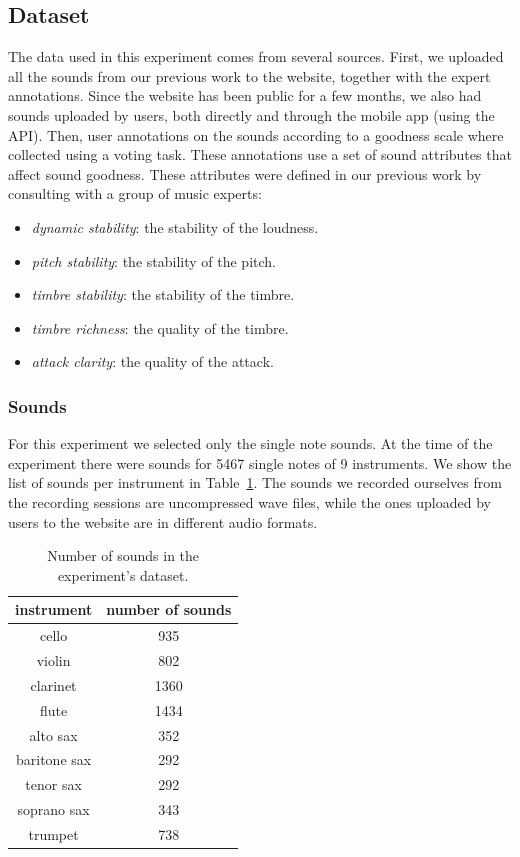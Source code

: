 \documentclass{article}
\begin{document}
\subsection{Dataset}
The data used in this experiment comes from several sources. First, we uploaded all the sounds from our previous work to the website, together with the expert annotations. Since the website has been public for a few months, we also had  sounds uploaded by users, both directly and through the mobile app (using the API). Then, user annotations on the sounds according to a goodness scale where collected using a voting task. These annotations use a set of sound attributes that affect sound goodness. These attributes were defined in our previous work \cite{01} by consulting with a group of music experts:   
\begin{itemize}
	\item{\textit{dynamic stability}: the stability of the loudness.}
	\item{\textit{pitch stability}: the stability of the pitch.}
	\item{\textit{timbre stability}: the stability of the timbre.}
	\item{\textit{timbre richness}: the quality of the timbre.}
	\item{\textit{attack clarity}: the quality of the attack.}
\end{itemize}

\subsubsection{Sounds}
For this experiment we selected only the single note sounds. At the time of the experiment there were sounds for 5467 single notes of 9 instruments. We show the list of sounds per instrument in Table~\ref{sounds}. The sounds we recorded ourselves from the recording sessions are uncompressed wave files, while the ones uploaded by users to the website are in different audio formats.  

\begin{table}[ht]
\centering
\begin{tabular}{cc}
\hline
instrument   & number of sounds \\ \hline
cello        & 935              \\
violin       & 802              \\
clarinet     & 1360             \\
flute        & 1434             \\
alto sax     & 352              \\
baritone sax & 292              \\
tenor sax    & 292              \\
soprano sax  & 343              \\
trumpet      & 738              \\ \hline
\end{tabular}
\caption{Number of sounds in the experiment's dataset.}
\label{sounds}
\end{table}
\end{document}
